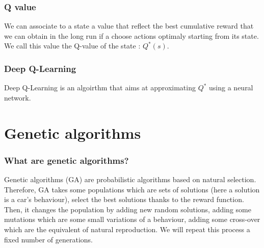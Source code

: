 \documentclass[11pt,a4paper]{article}
\begin{document}
		\section{Q value}

		We can associate to a state a value that reflect the best cumulative reward that we can obtain 
		in the long run if a choose actions optimaly starting from its state. We call this value the Q-value of the state : $Q^*(s)$.

		\section{Deep Q-Learning}

		Deep Q-Learning is an algoirthm that aims at approximating $Q^*$ using a neural network.

		


	
	\part{Genetic algorithms}
		\section{What are genetic algorithms?}
Genetic algorithms (GA) are probabilistic algorithms based on natural selection. Therefore, GA takes some populations which are sets of solutions (here a solution is a car's behaviour), select the best solutions thanks to the reward function. Then, it changes the population by adding new random solutions, adding some mutations which are some small variations of a behaviour, adding some cross-over which are the equivalent of natural reproduction. We will repeat this process a fixed number of generations.
		
\end{document}
